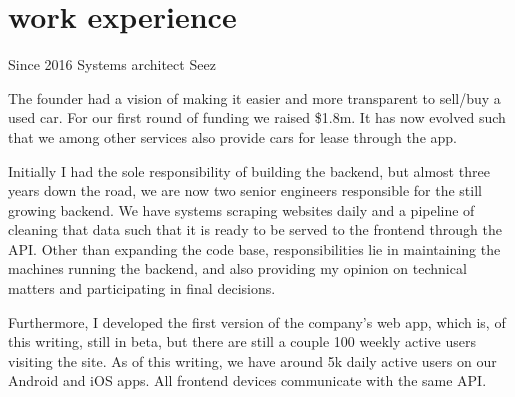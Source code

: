 \documentclass[]{friggeri-cv}
\begin{document}
\section{work experience}

\begin{entrylist}
  \entry
    {Since 2016}
    {Systems architect}
    {Seez}
    {
      The founder had a vision of making it easier and more transparent to sell/buy a used car.
      For our first round of funding we raised \$1.8m.
      It has now evolved such that we among other services also provide cars for lease through the app.
    
      Initially I had the sole responsibility of building the backend, but almost three years down the road, we are now two senior engineers responsible for the still growing backend.
      We have systems scraping websites daily and a pipeline of cleaning that data such that it is ready to be served to the frontend through the API.
      Other than expanding the code base, responsibilities lie in maintaining the machines running the backend, and also providing my opinion on technical matters and participating in final decisions.
      
      Furthermore, I developed the first version of the company's web app, which is, of this writing, still in beta, but there are still a couple 100 weekly active users visiting the site. As of this writing, we have around 5k daily active users on our Android and iOS apps. All frontend devices communicate with the same API.
    
}
\end{entrylist}
\end{document}
